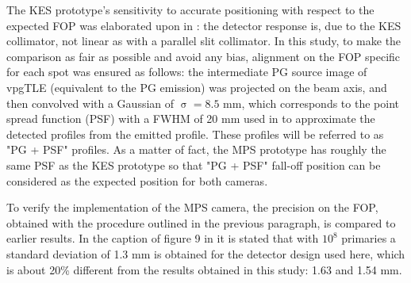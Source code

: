 \documentclass[a4paper,english]{article}
\begin{document}
The KES prototype's sensitivity to accurate positioning with respect to the expected FOP was elaborated upon in \citet[Section IV.A.3]{Sterpin2015}: the detector response is, due to the KES collimator, not linear as with a parallel slit collimator. In this study, to make the comparison as fair as possible and avoid any bias, alignment on the FOP specific for each spot was ensured as follows: the intermediate PG source image of vpgTLE (equivalent to the PG emission) was projected on the beam axis, and then convolved with a Gaussian of $\upsigma = 8.5$ mm, which corresponds to the point spread function (PSF) with a FWHM of 20 mm used in \cite{Priegnitz2015} to approximate the detected profiles from the emitted profile. These profiles will be referred to as "PG + PSF" profiles. As a matter of fact, the MPS prototype has roughly the same PSF as the KES prototype so that "PG + PSF" fall-off position can be considered as the expected position for both cameras.

To verify the implementation of the MPS camera, the precision on the FOP, obtained with the procedure outlined in the previous paragraph, is compared to earlier results. In the caption of figure 9 in \cite{Pinto2014a} it is stated that with $10^8$ primaries a standard deviation of 1.3 mm is obtained for the detector design used here, which is about 20\% different from the results obtained in this study: 1.63 and 1.54 mm.
\newpage




\end{document}
